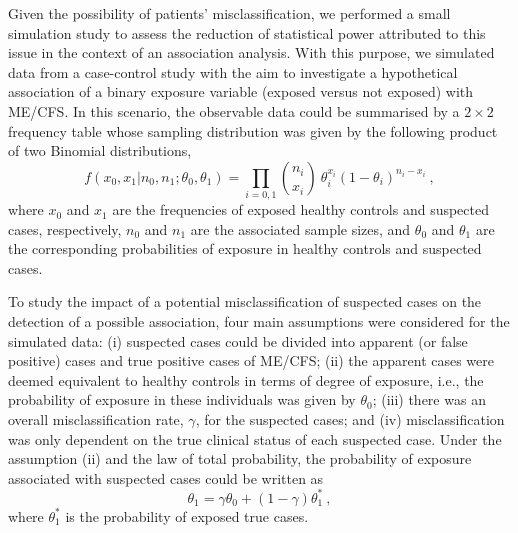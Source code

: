 Given the possibility of patients' misclassification, we performed a small simulation study to assess the reduction of statistical power attributed to this issue in the context of an association analysis. With this purpose, we simulated data from a case-control study with the aim to investigate a hypothetical association of a binary exposure variable (exposed versus not exposed) with ME/CFS. In this scenario, the observable data could be summarised by a $2 \times 2$ frequency table whose sampling distribution was given by the following product of two Binomial distributions,
% 
\begin{equation}
    f \left( x_0, x_1 | n_0, n_1; \theta_0, \theta_1 \right) = \prod_{i=0,1} \binom{n_i}{x_i} \  \theta_i^{x_i} (1 - \theta_i)^{n_i - x_i} \ ,
    \label{eq:augmented-version-2-by-2}
\end{equation}
% 
where $x_{0}$ and $x_{1}$ are the frequencies of exposed healthy controls and suspected cases, respectively, $n_0$ and $n_1$ are the associated sample sizes, and $\theta_{0}$ and $\theta_{1}$ are the corresponding probabilities of exposure in healthy controls and suspected cases. %

To study the impact of a potential misclassification of suspected cases on the detection of a possible association, four main assumptions were considered for the simulated data: (i) suspected cases could be divided into apparent (or false positive) cases and true positive cases of ME/CFS; (ii) the apparent cases were deemed equivalent to healthy controls in terms of degree of exposure, i.e., the probability of exposure in these individuals was given by $\theta_0$; (iii) there was an overall misclassification rate, $\gamma$, for the suspected cases; and (iv) misclassification was only dependent on the true clinical status of each suspected case. 
Under the assumption (ii) and the law of total probability, the probability of exposure associated with suspected cases could be written as 
% 
\begin{equation}
    \theta_{1} = \gamma \theta_0 + (1-\gamma) \theta^*_1 \	,
\end{equation}
% 
where $\theta^*_1$ is the probability of exposed true cases.

